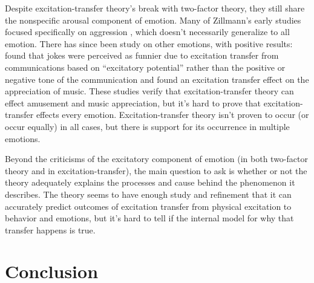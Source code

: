 \documentclass[
  stu,
  12pt]{apa7}
\begin{document}
Despite excitation-transfer theory's break with two-factor theory, they
still share the nonspecific arousal component of emotion. Many of
Zillmann's early studies focused specifically on aggression
\autocite{zilExcitationTransferCommunicationmediated,zilExcitationTransferPhysical,zilEffectResidualExcitation},
which doesn't necessarily generalize to all emotion. There has since
been study on other emotions, with positive results:
\textcite{canEnhancementHumorAppreciation} found that jokes were
perceived as funnier due to excitation transfer from communications
based on ``excitatory potential'' rather than the positive or negative
tone of the communication and \textcite{canEffectAffectiveState} found
an excitation transfer effect on the appreciation of music. These
studies verify that excitation-transfer theory can effect amusement and
music appreciation, but it's hard to prove that excitation-transfer
effects every emotion. Excitation-transfer theory isn't proven to occur
(or occur equally) in all cases, but there is support for its occurrence
in multiple emotions.

Beyond the criticisms of the excitatory component of emotion (in both
two-factor theory and in excitation-transfer), the main question to ask
is whether or not the theory adequately explains the processes and cause
behind the phenomenon it describes. The theory seems to have enough
study and refinement that it can accurately predict outcomes of
excitation transfer from physical excitation to behavior and emotions,
but it's hard to tell if the internal model for why that transfer
happens is true.

\hypertarget{conclusion}{%
\section{Conclusion}\label{conclusion}}
\end{document}
